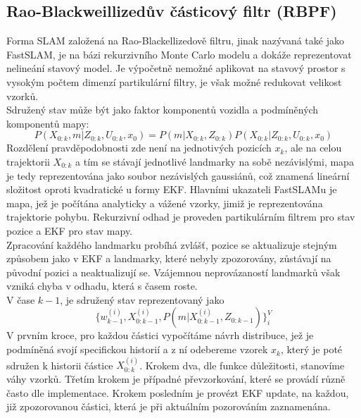 \documentclass[11pt]{article}
\begin{document}
\subsection{Rao-Blackweillizedův částicový filtr (RBPF)}
Forma SLAM založená na Rao-Blackellizedově filtru, jinak nazývaná také jako FastSLAM, je na bázi rekurzivního Monte Carlo modelu a dokáže reprezentovat nelineání stavový model. Je výpočetně nemožné aplikovat na stavový prostor s vysokým počtem dimenzí partikulární filtry, je však možné redukovat velikost vzorků. \\
Sdružený stav může být jako faktor komponentů vozidla a podmíněných komponentů mapy:
$$P(X_{0:k},m|Z_{0:k},U_{0:k},x_0)=P(m|X_{0:k},Z_{0:k})P(X_{0:k}|Z_{0:k},U_{0:k},x_0) $$ 
Rozdělení pravděpodobnosti zde není na jednotivých pozicích $x_k$, ale na celou trajektorii $X_{0:k}$ a tím se stávají jednotlivé landmarky na sobě nezávislými, mapa je tedy reprezentována jako soubor nezávislých gaussiánů, což znamená lineární složitost oproti kvadratické u formy EKF. Hlavními ukazateli FastSLAMu je mapa, jež je počítána analyticky a vážené vzorky, jimiž je reprezentována trajektorie pohybu. Rekurzivní odhad je proveden partikulárním filtrem pro stav pozice a EKF pro stav mapy.\\
\indent Zpracování každého landmarku probíhá zvlášť, pozice se aktualizuje stejným způsobem jako v EKF a landmarky, které nebyly zpozorovány, zůstávají na původní pozici a neaktualizují se. Vzájemnou neprovázaností landmarků však vzniká chyba v odhadu, která s časem roste.\\
\indent V čase $k-1$, je sdružený stav reprezentovaný jako 
$$\{w^{(i)}_{k-1},X^{(i)}_{0:k-1},P(m|X^{(i)}_{0:k-1},Z_{0:k-1})\}^V_i$$
V prvním kroce, pro každou částici vypočítáme návrh distribuce, jež je podmíněná svojí specifickou historií a z ní odebereme vzorek $x_k$, který je poté sdružen k historii částice $X^{(i)}_{0:k}$. Krokem dva, dle funkce důležitosti, stanovíme váhy vzorků. Třetím krokem je případné převzorkování, které se provádí různě často dle implementace. Krokem posledním je provézt EKF update, na každou, již zpozorovanou částici, která je při aktuálním pozorováním zaznamenána. 
\end{document}

